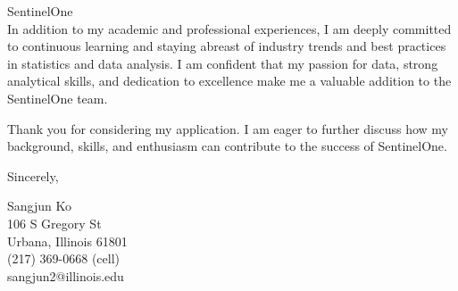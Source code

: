 \documentclass{letter}
\begin{document}
\begin{letter}{
    SentinelOne\\
}
In addition to my academic and professional experiences, I am deeply committed to continuous learning and staying abreast of industry trends and best practices in statistics and data analysis. I am confident that my passion for data, strong analytical skills, and dedication to excellence make me a valuable addition to the SentinelOne team.

Thank you for considering my application. I am eager to further discuss how my background, skills, and enthusiasm can contribute to the success of SentinelOne.
\closing{Sincerely,
}

Sangjun Ko\\
106 S Gregory St\\
Urbana, Illinois 61801\\
(217) 369-0668 (cell)\\sangjun2@illinois.edu
\end{letter}
\end{document}
